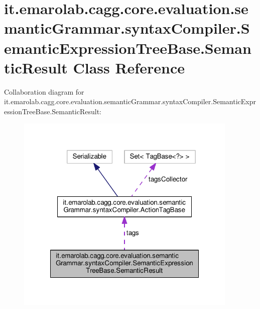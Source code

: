 \hypertarget{classit_1_1emarolab_1_1cagg_1_1core_1_1evaluation_1_1semanticGrammar_1_1syntaxCompiler_1_1Semant5d395032261986aec1b33357dd21b6bb}{\section{it.\-emarolab.\-cagg.\-core.\-evaluation.\-semantic\-Grammar.\-syntax\-Compiler.\-Semantic\-Expression\-Tree\-Base.\-Semantic\-Result Class Reference}
\label{classit_1_1emarolab_1_1cagg_1_1core_1_1evaluation_1_1semanticGrammar_1_1syntaxCompiler_1_1Semant5d395032261986aec1b33357dd21b6bb}
}


Collaboration diagram for it.\-emarolab.\-cagg.\-core.\-evaluation.\-semantic\-Grammar.\-syntax\-Compiler.\-Semantic\-Expression\-Tree\-Base.\-Semantic\-Result\-:\nopagebreak
\begin{figure}[H]
\begin{center}
\leavevmode
\includegraphics[width=300pt]{classit_1_1emarolab_1_1cagg_1_1core_1_1evaluation_1_1semanticGrammar_1_1syntaxCompiler_1_1Semant8a329e86160f8b370324c28d7ae6af46}
\end{center}
\end{figure}
